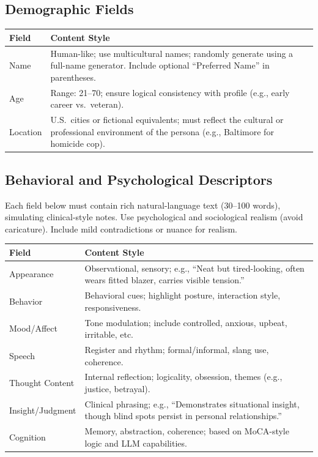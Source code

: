 \documentclass[11pt]{article}
\begin{document}
\subsection*{Demographic Fields}
{\small
\begin{tabular}{|p{7cm}|p{9cm}|}
\hline
\textbf{Field} & \textbf{Content Style} \\
\hline
Name & Human-like; use multicultural names; randomly generate using a full-name generator. Include optional ``Preferred Name'' in parentheses. \\
\hline
Age & Range: 21--70; ensure logical consistency with profile (e.g., early career vs.\ veteran). \\
\hline
Location & U.S.\ cities or fictional equivalents; must reflect the cultural or professional environment of the persona (e.g., Baltimore for homicide cop). \\
\hline
\end{tabular}
}

\subsection*{Behavioral and Psychological Descriptors}
\noindent Each field below must contain rich natural-language text (30--100 words), simulating clinical-style notes. Use psychological and sociological realism (avoid caricature). Include mild contradictions or nuance for realism.

{\small
\begin{tabular}{|p{7cm}|p{9cm}|}
\hline
\textbf{Field} & \textbf{Content Style} \\
\hline
Appearance & Observational, sensory; e.g., ``Neat but tired-looking, often wears fitted blazer, carries visible tension.'' \\
\hline
Behavior & Behavioral cues; highlight posture, interaction style, responsiveness. \\
\hline
Mood/Affect & Tone modulation; include controlled, anxious, upbeat, irritable, etc. \\
\hline
Speech & Register and rhythm; formal/informal, slang use, coherence. \\
\hline
Thought Content & Internal reflection; logicality, obsession, themes (e.g., justice, betrayal). \\
\hline
Insight/Judgment & Clinical phrasing; e.g., ``Demonstrates situational insight, though blind spots persist in personal relationships.'' \\
\hline
Cognition & Memory, abstraction, coherence; based on MoCA-style logic and LLM capabilities. \\
\hline
\end{tabular}
}
\end{document}
